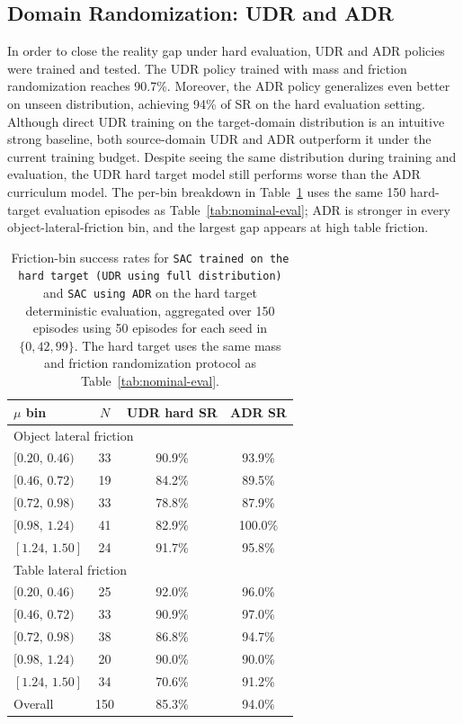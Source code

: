 \subsection{Domain Randomization: UDR and ADR}
In order to close the reality gap under hard evaluation, UDR and ADR policies were trained and tested.
The UDR policy trained with mass and friction randomization reaches 90.7\%.
Moreover, the ADR policy generalizes even better on unseen distribution, achieving 94\% of SR on the hard evaluation setting.
Although direct UDR training on the target-domain distribution is an intuitive strong baseline, both source-domain UDR and ADR outperform it under the current training budget.
Despite seeing the same distribution during training and evaluation, the UDR hard target model still performs worse than the ADR curriculum model.
The per-bin breakdown in Table~\ref{tab:udr-friction-bins} uses the same 150 hard-target evaluation episodes as Table~\ref{tab:nominal-eval}; ADR is stronger in every object-lateral-friction bin, and the largest gap appears at high table friction.

\begin{table}[H]
\centering
\small
\begin{tabular}{lccc}
\toprule
$\mu$ bin & $N$ & UDR hard SR & ADR SR \\
\midrule
\multicolumn{4}{l}{Object lateral friction} \\
$[0.20,\,0.46)$ & 33 & 90.9\% & 93.9\% \\
$[0.46,\,0.72)$ & 19 & 84.2\% & 89.5\% \\
$[0.72,\,0.98)$ & 33 & 78.8\% & 87.9\% \\
$[0.98,\,1.24)$ & 41 & 82.9\% & 100.0\% \\
$[1.24,\,1.50]$ & 24 & 91.7\% & 95.8\% \\
\midrule
\multicolumn{4}{l}{Table lateral friction} \\
$[0.20,\,0.46)$ & 25 & 92.0\% & 96.0\% \\
$[0.46,\,0.72)$ & 33 & 90.9\% & 97.0\% \\
$[0.72,\,0.98)$ & 38 & 86.8\% & 94.7\% \\
$[0.98,\,1.24)$ & 20 & 90.0\% & 90.0\% \\
$[1.24,\,1.50]$ & 34 & 70.6\% & 91.2\% \\
\midrule
Overall & 150 & 85.3\% & 94.0\% \\
\bottomrule
\end{tabular}
\caption{Friction-bin success rates for \texttt{SAC trained on the hard target (UDR using full distribution)} and \texttt{SAC using ADR} on the hard target deterministic evaluation, aggregated over 150 episodes using 50 episodes for each seed in $\{0,42,99\}$. The hard target uses the same mass and friction randomization protocol as Table~\ref{tab:nominal-eval}.}
\label{tab:udr-friction-bins}
\end{table}
